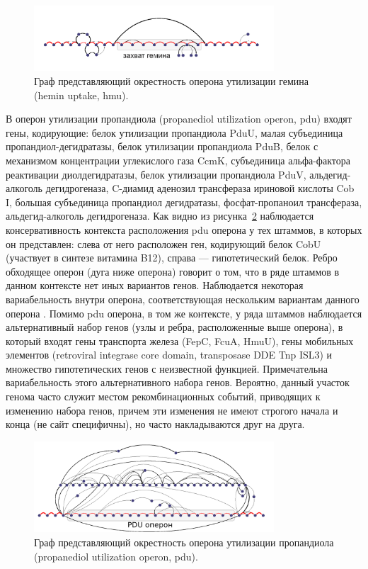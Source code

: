 \begin{figure}[!ht] 
  \center
  \includegraphics[width=0.8\textwidth]{Dissertation/images/subgraphs/hemin.png}
  \caption{Граф представляющий окрестность оперона утилизации гемина (hemin uptake, hmu).}
  \label{img:sub_hem} 
\end{figure}

В оперон утилизации пропандиола (propanediol utilization operon, pdu) входят гены, кодирующие: белок утилизации пропандиола PduU, малая субъединица пропандиол-дегидратазы, белок утилизации пропандиола PduB, белок с механизмом концентрации углекислого газа CcmK, субъединица альфа-фактора реактивации диолдегидратазы, белок утилизации пропандиола PduV, альдегид-алкоголь дегидрогеназа, C-диамид аденозил трансфераза ириновой кислоты Cob I, большая субъединица  пропандиол дегидратазы, фосфат-пропаноил трансфераза, альдегид-алкоголь дегидрогеназа. Как видно из рисунка~\ref{img:sub_pdu} наблюдается консервативность контекста расположения pdu оперона у тех штаммов, в которых он представлен: слева от него расположен ген, кодирующий белок CobU  (участвует в синтезе витамина B12), справа --- гипотетический белок. Ребро обходящее оперон (дуга ниже оперона) говорит о том, что в ряде штаммов в данном контексте нет иных вариантов генов. Наблюдается некоторая вариабельность внутри оперона, соответствующая нескольким вариантам данного оперона \cite{rakitina2017genome}. Помимо pdu оперона, в том же контексте, у ряда штаммов наблюдается альтернативный набор генов (узлы и ребра, расположенные выше оперона), в который входят гены транспорта железа (FepC, FcuA, HmuU), гены мобильных элементов (retroviral integrase core domain, transposase DDE Tnp ISL3) и множество гипотетических генов с неизвестной функцией. Примечательна вариабельность этого альтернативного набора генов. Вероятно, данный участок генома часто служит местом рекомбинационных событий, приводящих к изменению набора генов, причем эти изменения не имеют строгого начала и конца (не сайт специфичны), но часто накладываются друг на друга. 

\begin{figure}[!ht] 
  \center
    \includegraphics[width=0.8\textwidth]{Dissertation/images/subgraphs/pdu_laconic.png}
  \caption{Граф представляющий окрестность оперона утилизации пропандиола (propanediol utilization operon, pdu). }
  \label{img:sub_pdu} 
\end{figure}

